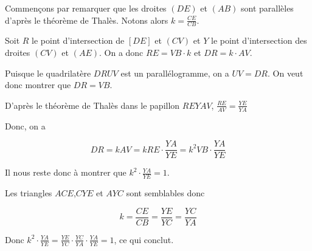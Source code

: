 \begin{sol}

\begin{center}
\end{center}

Commençons par remarquer que les droites $(DE)$ et $(AB)$ sont parallèles d'après le théorème de Thalès. Notons alors $k=\frac{CE}{CB}$.

\medskip

Soit $R$ le point d'intersection de $[DE]$ et $(CV)$ et $Y$ le point d'intersection des droites $(CV)$ et $(AE)$. On a donc $RE= VB \cdot k$ et $DR = k \cdot AV$.

Puisque le quadrilatère $DRUV$ est un parallélogramme, on a $UV=DR$. On veut donc montrer que $DR=VB$.

D'après le théorème de Thalès dans le papillon $REYAV$, $\frac{RE}{AV} = \frac{YE}{YA}$

Donc, on a

\[DR=kAV= k RE\cdot \frac{YA}{YE} = k^2 VB\cdot \frac{YA}{YE}\]

Il nous reste donc à montrer que $k^2 \cdot \frac{YA}{YE} = 1$.

Les triangles $ACE$,$CYE$ et $AYC$ sont semblables donc

\[ k = \frac{CE}{CB} = \frac{YE}{YC} = \frac{YC}{YA}\]


Donc $k^2 \cdot \frac{YA}{YE} = \frac{YE}{YC} \cdot \frac{YC}{YA} \cdot \frac{YA}{YE} = 1$, ce qui conclut.
\end{sol}

